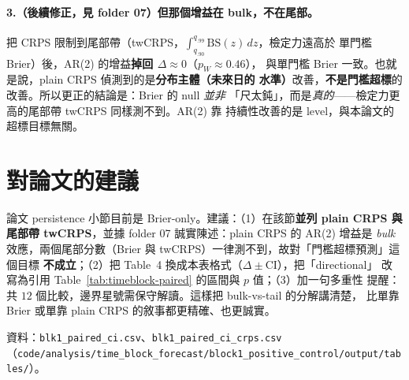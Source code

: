 \documentclass[12pt]{article}
\begin{document}
\paragraph{3.（後續修正，見 folder 07）但那個增益在 bulk，不在尾部。}把 CRPS
限制到尾部帶（twCRPS，$\int_{q_{.90}}^{q_{.99}}\mathrm{BS}(z)\,dz$，檢定力遠高於
單門檻 Brier）後，AR(2) 的增益\textbf{掉回 $\Delta\approx0$}（$p_W\approx0.46$），
與單門檻 Brier 一致。也就是說，plain CRPS 偵測到的是\textbf{分布主體（未來日的
水準）}改善，\textbf{不是門檻超標}的改善。所以更正的結論是：Brier 的 null \emph{並非}
「尺太鈍」，而是\emph{真的}——檢定力更高的尾部帶 twCRPS 同樣測不到。AR(2) 靠
持續性改善的是 level，與本論文的超標目標無關。

\section*{對論文的建議}

論文 persistence 小節目前是 Brier-only。建議：（1）在該節\textbf{並列 plain CRPS
與尾部帶 twCRPS}，並據 folder 07 誠實陳述：plain CRPS 的 AR(2) 增益是 \emph{bulk}
效應，兩個尾部分數（Brier 與 twCRPS）一律測不到，故對「門檻超標預測」這個目標
\textbf{不成立}；（2）把 Table~4 換成本表格式（$\Delta\pm$CI），把「directional」
改寫為引用 Table~\ref{tab:timeblock-paired} 的區間與 $p$ 值；（3）加一句多重性
提醒：共 $12$ 個比較，邊界星號需保守解讀。這樣把 bulk-vs-tail 的分解講清楚，
比單靠 Brier 或單靠 plain CRPS 的敘事都更精確、也更誠實。

\medskip
\noindent\footnotesize 資料：\verb|blk1_paired_ci.csv|、\verb|blk1_paired_ci_crps.csv|
（\verb|code/analysis/time_block_forecast/block1_positive_control/output/tables/|）。
\end{document}
